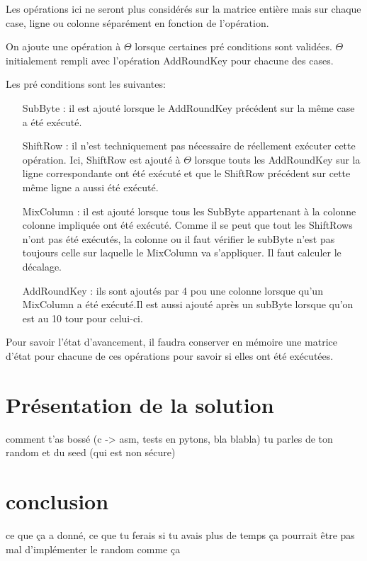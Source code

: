\documentclass[letterpaper]{article}
\begin{document}
Les opérations ici ne seront plus considérés sur la matrice entière mais sur chaque case, ligne ou colonne séparément en fonction de l'opération.

On ajoute une opération à $\Theta$ lorsque certaines pré conditions sont validées.
$\Theta$ initialement rempli avec l'opération AddRoundKey pour chacune des cases.

Les pré conditions sont les suivantes:
\begin{itemize}
    \item[SubByte :] il est ajouté lorsque le AddRoundKey précédent sur la même case a été exécuté.
    \item[ShiftRow :] il n'est techniquement pas nécessaire de réellement exécuter cette opération. Ici, ShiftRow est ajouté à $\Theta$ lorsque touts les AddRoundKey sur la ligne correspondante ont été exécuté et que le ShiftRow précédent sur cette même ligne a aussi été exécuté.
    \item[MixColumn :] il est ajouté lorsque tous les SubByte appartenant à la colonne colonne impliquée ont été exécuté. Comme il se peut que tout les ShiftRows n'ont pas été exécutés, la colonne ou il faut vérifier le subByte n'est pas toujours celle sur laquelle le MixColumn va s'appliquer. Il faut calculer le décalage.
    \item[AddRoundKey :] ils sont ajoutés par 4 pou une colonne lorsque qu'un MixColumn a été exécuté.Il est aussi ajouté après un subByte lorsque qu'on est au 10 tour pour celui-ci.\\
\end{itemize}

Pour savoir l'état d'avancement, il faudra conserver en mémoire une matrice d'état pour chacune de ces opérations pour savoir si elles ont été exécutées.

\section{Présentation de la solution}
comment t'as bossé (c -> asm, tests en pytons, bla blabla)
tu parles de ton random et du seed (qui est non sécure)

\section{conclusion}
ce que ça a donné, ce que tu ferais si tu avais plus de temps
ça pourrait être pas mal d'implémenter le random comme ça

\footnotesize


\end{document}
